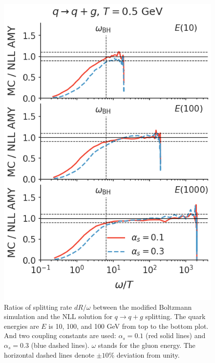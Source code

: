 \documentclass[aps, prc, reprint, amsmath, groupedaddress, nofootinbib]{revtex4-1}
\begin{document}
\begin{appendices}
\begin{figure}
\includegraphics[width=\columnwidth]{spectrum_E_q2qg.png}
\caption{Ratios of splitting rate $dR/\omega$ between the modified Boltzmann simulation and the NLL solution for $q\rightarrow q+g$ splitting. The quark energies are $E$ is 10, 100, and 100 GeV from top to the bottom plot. 
And two coupling constants are used: $\alpha_s = 0.1$ (red solid lines) and $\alpha_s = 0.3$ (blue dashed lines).
$\omega$ stands for the gluon energy.
The horizontal dashed lines denote $\pm 10\%$ deviation from unity. }
\label{fig:q2qg}
\end{figure}


\end{appendices}
\end{document}
